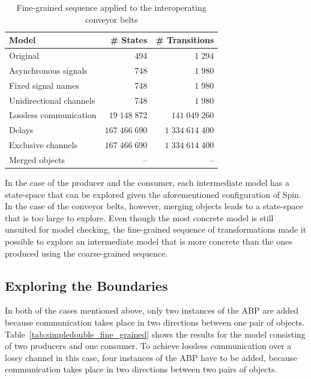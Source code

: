 \begin{table}[hbt]
\centering
\small
\begin{tabular}{|l|r|r|}
\hline
\rowcolor[gray]{.9}
 \textbf{Model}         & \textbf{\# States} & \textbf{\# Transitions} \\
\hline
 Original               & 494                & $1\;294$ \\
\hline
 Asynchronous signals   & 748                & $1\;980$ \\
\hline
 Fixed signal names     & 748                & $1\;980$ \\
\hline
 Unidirectional channels& 748                & $1\;980$ \\
\hline
 Lossless communication & $19\;148\;872$     & $141\;049\;260$ \\
\hline
 Delays                 & $167\;466\;690$    & $1\;334\;614\;400$ \\
\hline
 Exclusive channels     & $167\;466\;690$    & $1\;334\;614\;400$ \\
\hline
 Merged objects         & --                 & -- \\
\hline
\end{tabular}
\caption{Fine-grained sequence applied to the interoperating conveyor belts}
\label{tab:legocase_fine_grained}
\end{table}

In the case of the producer and the consumer, each intermediate model has a state-space that can be explored given the aforementioned configuration of Spin.
In the case of the conveyor belts, however, merging objects leads to a state-space that is too large to explore.
Even though the most concrete model is still unsuited for model checking, the fine-grained sequence of transformations made it possible to explore an intermediate model that is more concrete than the ones produced using the coarse-grained sequence.

\subsection{Exploring the Boundaries}
In both of the cases mentioned above, only two instances of the ABP are added because communication takes place in two directions between one pair of objects.
Table~\ref{tab:simpledouble_fine_grained} shows the results for the model consisting of two producers and one consumer.
To achieve lossless communication over a lossy channel in this case, four instances of the ABP have to be added, because communication takes place in two directions between two pairs of objects.

